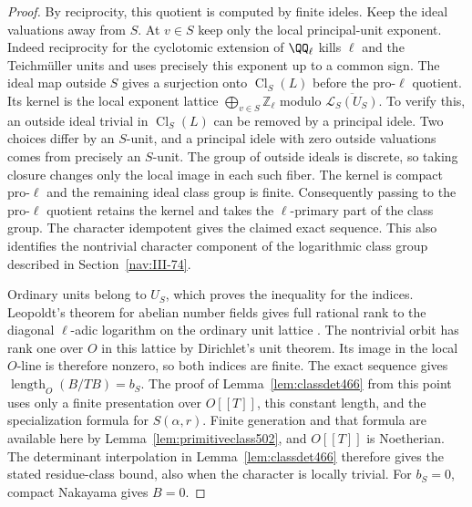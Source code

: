 \documentclass[a4paper,11pt]{article}
\theoremstyle{definition}
\theoremstyle{remark}
\newcommand{\ZZ}{\mathbb Z}\newcommand{\ord}{\operatorname{ord}}
\numberwithin{equation}{section}
\newcommand{\Cl}{\operatorname{Cl}}
\begin{document}
\begin{proof}
By reciprocity, this quotient is computed by finite ideles.
Keep the ideal valuations away from \(S\). At \(v\in S\) keep
only the local principal-unit exponent. Indeed reciprocity for
the cyclotomic extension of \(\QQ_\ell\) kills \(\ell\) and the
Teichm\"uller units and uses precisely this exponent up to a
common sign. The ideal map outside \(S\) gives a surjection
onto \(\Cl_S(L)\) before the pro-\(\ell\) quotient. Its kernel
is the local exponent lattice \(\bigoplus_{v\in S}\ZZ_\ell\)
modulo \(\overline{\mathcal L_S(U_S)}\). To verify this, an
outside ideal trivial in \(\Cl_S(L)\) can be removed by a
principal idele. Two choices differ by an \(S\)-unit, and a
principal idele with zero outside valuations comes from
precisely an \(S\)-unit. The group of outside ideals is discrete,
so taking closure changes only the local image in each such
fiber. The kernel is compact pro-\(\ell\) and the remaining
ideal class group is finite. Consequently passing to the
pro-\(\ell\) quotient retains the kernel and takes the
\(\ell\)-primary part of the class group. The character
idempotent gives the claimed exact sequence. This also
identifies the nontrivial character component of the logarithmic
class group described in Section~\ref{nav:III-74}.

Ordinary units belong to \(U_S\), which proves the inequality
for the indices. Leopoldt's theorem for abelian number fields
gives full rational rank to the diagonal \(\ell\)-adic logarithm
on the ordinary unit lattice \cite{XI-VIII-brumer330}. The nontrivial
orbit has rank one over \(O\) in this lattice by Dirichlet's
unit theorem. Its image in the local \(O\)-line is therefore
nonzero, so both indices are finite. The exact sequence gives
\(\operatorname{length}_O(B/TB)=b_S\). The proof of
Lemma~\ref{lem:classdet466} from this point uses only a finite
presentation over \(O[[T]]\), this constant length, and the
specialization formula for \(S(\alpha,r)\). Finite generation
and that formula are available here by
Lemma~\ref{lem:primitiveclass502}, and \(O[[T]]\) is Noetherian.
The determinant interpolation in Lemma~\ref{lem:classdet466}
therefore gives the stated residue-class bound, also when the
character is locally trivial. For \(b_S=0\), compact Nakayama
gives \(B=0\).
\end{proof}
\end{document}
